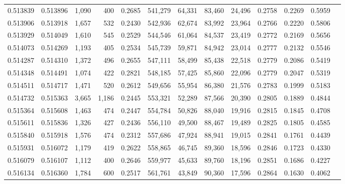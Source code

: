 \begin{tabular}{rrrrrrrrrrrrr}
0.513839 & 0.513896 & 1,090 &   400 &                                     0.2685 & 541,279 &  64,331 &  83,460 &  24,496 & 0.2758 & 0.2269 & 0.5959 \\
0.513906 & 0.513918 & 1,657 &   532 &                                     0.2430 & 542,936 &  62,674 &  83,992 &  23,964 & 0.2766 & 0.2220 & 0.5806 \\
0.513929 & 0.514049 & 1,610 &   545 &                                     0.2529 & 544,546 &  61,064 &  84,537 &  23,419 & 0.2772 & 0.2169 & 0.5656 \\
0.514073 & 0.514269 & 1,193 &   405 &                                     0.2534 & 545,739 &  59,871 &  84,942 &  23,014 & 0.2777 & 0.2132 & 0.5546 \\
0.514287 & 0.514310 & 1,372 &   496 &                                     0.2655 & 547,111 &  58,499 &  85,438 &  22,518 & 0.2779 & 0.2086 & 0.5419 \\
0.514348 & 0.514491 & 1,074 &   422 &                                     0.2821 & 548,185 &  57,425 &  85,860 &  22,096 & 0.2779 & 0.2047 & 0.5319 \\
0.514511 & 0.514717 & 1,471 &   520 &                                     0.2612 & 549,656 &  55,954 &  86,380 &  21,576 & 0.2783 & 0.1999 & 0.5183 \\
0.514732 & 0.515363 & 3,665 & 1,186 &                                     0.2445 & 553,321 &  52,289 &  87,566 &  20,390 & 0.2805 & 0.1889 & 0.4844 \\
0.515364 & 0.515608 & 1,463 &   474 &                                     0.2447 & 554,784 &  50,826 &  88,040 &  19,916 & 0.2815 & 0.1845 & 0.4708 \\
0.515611 & 0.515836 & 1,326 &   427 &                                     0.2436 & 556,110 &  49,500 &  88,467 &  19,489 & 0.2825 & 0.1805 & 0.4585 \\
0.515840 & 0.515918 & 1,576 &   474 &                                     0.2312 & 557,686 &  47,924 &  88,941 &  19,015 & 0.2841 & 0.1761 & 0.4439 \\
0.515931 & 0.516072 & 1,179 &   419 &                                     0.2622 & 558,865 &  46,745 &  89,360 &  18,596 & 0.2846 & 0.1723 & 0.4330 \\
0.516079 & 0.516107 & 1,112 &   400 &                                     0.2646 & 559,977 &  45,633 &  89,760 &  18,196 & 0.2851 & 0.1686 & 0.4227 \\
0.516134 & 0.516360 & 1,784 &   600 &                                     0.2517 & 561,761 &  43,849 &  90,360 &  17,596 & 0.2864 & 0.1630 & 0.4062 \\

\end{tabular}

